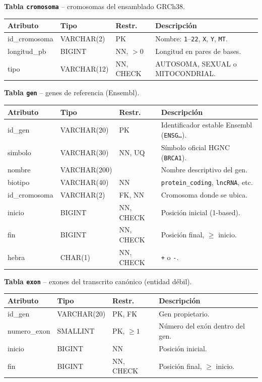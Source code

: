 \documentclass[11pt,a4paper]{article}
\newcommand{\tb}[1]{\texttt{#1}}
\begin{document}
\newcommand{\dictab}[2]{%
\par\medskip\noindent\textbf{Tabla \tb{#1}} -- #2\par\smallskip
}
\newenvironment{dic}{%
\small
\begin{longtable}{>{\ttfamily}p{3.1cm} >{\ttfamily}p{2.9cm} p{1.9cm} >{\raggedright\arraybackslash}p{6.6cm}}
\toprule
\normalfont\textbf{Atributo} & \normalfont\textbf{Tipo} & \textbf{Restr.} & \textbf{Descripción} \\
\midrule
\endhead
}{%
\bottomrule
\end{longtable}
}

\dictab{cromosoma}{cromosomas del ensamblado GRCh38.}
\begin{dic}
id\_cromosoma & VARCHAR(2) & PK & Nombre: \tb{1}--\tb{22}, \tb{X}, \tb{Y}, \tb{MT}. \\
longitud\_pb & BIGINT & NN, $>0$ & Longitud en pares de bases. \\
tipo & VARCHAR(12) & NN, CHECK & AUTOSOMA, SEXUAL o MITOCONDRIAL. \\
\end{dic}

\dictab{gen}{genes de referencia (Ensembl).}
\begin{dic}
id\_gen & VARCHAR(20) & PK & Identificador estable Ensembl (\tb{ENSG\ldots}). \\
simbolo & VARCHAR(30) & NN, UQ & Símbolo oficial HGNC (\tb{BRCA1}). \\
nombre & VARCHAR(200) & & Nombre descriptivo del gen. \\
biotipo & VARCHAR(40) & NN & \tb{protein\_coding}, \tb{lncRNA}, etc. \\
id\_cromosoma & VARCHAR(2) & FK, NN & Cromosoma donde se ubica. \\
inicio & BIGINT & NN, CHECK & Posición inicial (1-based). \\
fin & BIGINT & NN, CHECK & Posición final, $\geq$ inicio. \\
hebra & CHAR(1) & NN, CHECK & \tb{+} o \tb{-}. \\
\end{dic}

\dictab{exon}{exones del transcrito canónico (entidad débil).}
\begin{dic}
id\_gen & VARCHAR(20) & PK, FK & Gen propietario. \\
numero\_exon & SMALLINT & PK, $\geq 1$ & Número del exón dentro del gen. \\
inicio & BIGINT & NN & Posición inicial. \\
fin & BIGINT & NN, CHECK & Posición final, $\geq$ inicio. \\
\end{dic}
\end{document}
